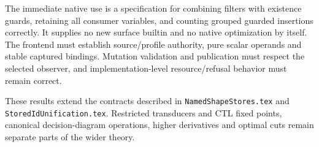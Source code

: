 \documentclass[11pt,a4paper]{article}
\newcommand{\code}[1]{\nolinkurl{#1}}
\begin{document}
The immediate native use is a specification for combining filters with
existence guards, retaining all consumer variables, and counting grouped
guarded insertions correctly. It supplies no new surface builtin and no native
optimization by itself. The frontend must establish source/profile authority,
pure scalar operands and stable captured bindings. Mutation validation and
publication must respect the selected observer, and implementation-level
resource/refusal behavior must remain correct.

These results extend the contracts described in \code{NamedShapeStores.tex}
and \code{StoredIdUnification.tex}. Restricted transducers and CTL fixed points,
canonical decision-diagram operations, higher derivatives and optimal cuts
remain separate parts of the wider theory.
\end{document}
